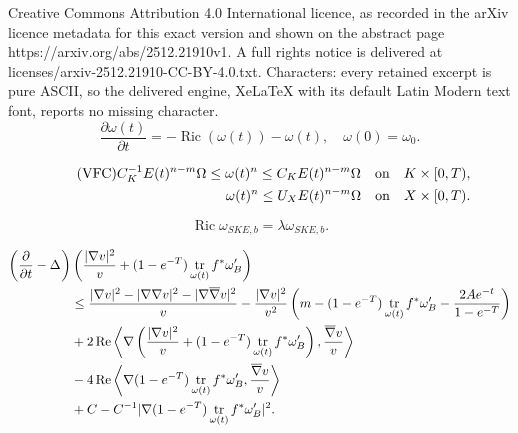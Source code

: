 \documentclass[10pt,a4paper]{amsart}
\DeclareMathOperator{\Real}{Re}
\DeclareMathOperator{\Ric}{Ric}
\DeclareMathOperator{\tr}{tr}
\newcommand{\ip}[1]{\left\langle#1\right\rangle}
\newcommand{\oo}[1]{\overline{#1}}
\newcommand{\parabolic}[1]{\left(\frac{\d}{\d t} - \Delta_{#1}\right)}
\renewcommand{\d}{\partial}
\begin{document}
Creative Commons Attribution 4.0 International licence, as recorded in the arXiv licence metadata for this exact version and shown on the abstract page https://arxiv.org/abs/2512.21910v1. A full rights notice is delivered at licenses/arxiv-2512.21910-CC-BY-4.0.txt. Characters: every retained excerpt is pure ASCII, so the delivered engine, XeLaTeX with its default Latin Modern text font, reports no missing character.
\begin{equation}\label{KRF}\tag{KRF}
    \frac{\d \omega(t)}{\d t} = -\Ric(\omega(t)) - \omega(t), \quad \omega(0) = \omega_0.
\end{equation}

\begin{align}\tag{VFC}\label{VFC}
    C_K^{-1}E(t)^{n-m}\Omega \leq \omega(t)^{n} \leq C_KE(t)^{n-m}\Omega \quad \text{on} \quad K \times [0,T),\\
    \omega(t)^n \leq U_XE(t)^{n-m} \Omega \quad \text{on} \quad X \times [0,T).\notag
\end{align}

\begin{equation}\tag{SKE}\label{SKE}
    \Ric \omega_{SKE,b} = \lambda \omega_{SKE,b}.
\end{equation}

\begin{align}\label{norm_grad_v_proof_inequality}
    \parabolic{}&\left(\frac{|\nabla v|^2}{v} + (1-e^{-T})\tr_{\omega(t)} f^*\omega'_B\right)\\\notag
    &\leq \frac{|\nabla v|^2 - |\nabla \nabla v|^2 - |\nabla \oo{\nabla} v|^2}{v}- \frac{|\nabla v|^2}{v^2} \left(m-(1-e^{-T})\tr_{\omega(t)} f^*\omega'_B - \frac{2A e^{-t}}{1-e^{-T}}\right)\\\notag
    &+ 2 \Real \ip{\nabla \left(\frac{|\nabla v|^2}{v}+ (1-e^{-T})\tr_{\omega(t)} f^*\omega'_B \right), \frac{\oo{\nabla} v}{v}}\\\notag
    &- 4 \Real \ip{\nabla (1-e^{-T})\tr_{\omega(t)}f^*\omega_B', \frac{\oo{\nabla} v}{v}}\\\notag
    &+ C - C^{-1}|\nabla (1-e^{-T})\tr_{\omega(t)} f^* \omega'_B|^2.\notag
\end{align}
\end{document}

